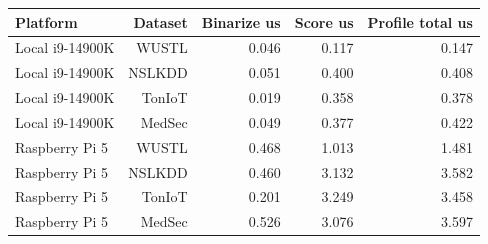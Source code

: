 \begin{tabular}{lrrrr}
\toprule
Platform & Dataset & Binarize us & Score us & Profile total us \\
\midrule
Local i9-14900K & WUSTL & 0.046 & 0.117 & 0.147 \\
Local i9-14900K & NSLKDD & 0.051 & 0.400 & 0.408 \\
Local i9-14900K & TonIoT & 0.019 & 0.358 & 0.378 \\
Local i9-14900K & MedSec & 0.049 & 0.377 & 0.422 \\
Raspberry Pi 5 & WUSTL & 0.468 & 1.013 & 1.481 \\
Raspberry Pi 5 & NSLKDD & 0.460 & 3.132 & 3.582 \\
Raspberry Pi 5 & TonIoT & 0.201 & 3.249 & 3.458 \\
Raspberry Pi 5 & MedSec & 0.526 & 3.076 & 3.597 \\
\bottomrule
\end{tabular}
